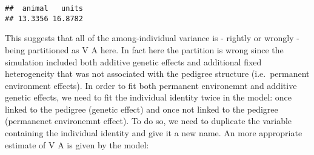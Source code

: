 \documentclass[
  12pt,
]{book}
\newenvironment{Shaded}{\begin{snugshade}}{\end{snugshade}}
\newcommand{\AttributeTok}[1]{\textcolor[rgb]{0.77,0.63,0.00}{#1}}
\newcommand{\ConstantTok}[1]{\textcolor[rgb]{0.00,0.00,0.00}{#1}}
\newcommand{\DecValTok}[1]{\textcolor[rgb]{0.00,0.00,0.81}{#1}}
\newcommand{\FloatTok}[1]{\textcolor[rgb]{0.00,0.00,0.81}{#1}}
\newcommand{\FunctionTok}[1]{\textcolor[rgb]{0.00,0.00,0.00}{#1}}
\newcommand{\NormalTok}[1]{#1}
\newcommand{\OtherTok}[1]{\textcolor[rgb]{0.56,0.35,0.01}{#1}}
\newcommand{\SpecialCharTok}[1]{\textcolor[rgb]{0.00,0.00,0.00}{#1}}
\begin{document}
\begin{Shaded}
\end{Shaded}

\begin{verbatim}
##  animal   units 
## 13.3356 16.8782
\end{verbatim}

This suggests that all of the among-individual variance is - rightly or wrongly - being partitioned as V A here. In fact here the partition is wrong since the simulation included both additive genetic effects and additional fixed heterogeneity that was not associated with the pedigree structure (i.e.~permanent environment effects).
In order to fit both permanent environemnt and additive genetic effects, we need to fit the individual identity twice in the model: once linked to the pedigree (genetic effect) and once not linked to the pedigree (permanenet environemnt effect).
To do so, we need to duplicate the variable containing the individual identity and give it a new name.
An more appropriate estimate of V A is given by the model:
\end{document}
